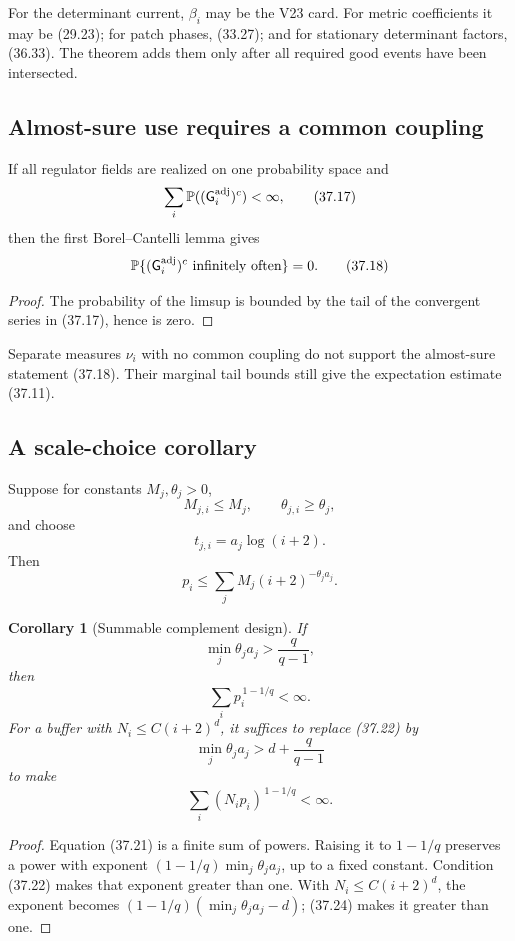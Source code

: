 \documentclass[11pt]{article}
\newtheorem{corollary}[theorem]{Corollary}
\begin{document}
For the determinant current, \(\beta_i\) may be the V23 card.  For
metric coefficients it may be (29.23); for patch phases, (33.27); and
for stationary determinant factors, (36.33).  The theorem adds them
only after all required good events have been intersected.

\subsection{Almost-sure use requires a common coupling}

If all regulator fields are realized on one probability space and
\[
 \sum_i\mathbb P((\mathsf G_i^{\rm adj})^c)<\infty,
 \tag{37.17}
\]
then the first Borel--Cantelli lemma gives
\[
 \mathbb P\{
 (\mathsf G_i^{\rm adj})^c\text{ infinitely often}
 \}=0.
 \tag{37.18}
\]

\begin{proof}
The probability of the limsup is bounded by the tail of the convergent
series in (37.17), hence is zero.
\end{proof}

Separate measures \(\nu_i\) with no common coupling do not support the
almost-sure statement (37.18).  Their marginal tail bounds still give
the expectation estimate (37.11).

\subsection{A scale-choice corollary}

Suppose for constants \(M_j,\theta_j>0\),
\[
 M_{j,i}\leq M_j,\qquad \theta_{j,i}\geq\theta_j,
 \tag{37.19}
\]
and choose
\[
 t_{j,i}=a_j\log(i+2).
 \tag{37.20}
\]
Then
\[
 p_i\leq
 \sum_jM_j(i+2)^{-\theta_ja_j}.
 \tag{37.21}
\]

\begin{corollary}[Summable complement design]
\label{cor:v11v37-scale-choice}
If
\[
 \min_j\theta_ja_j
 >
 \frac{q}{q-1},
 \tag{37.22}
\]
then
\[
 \sum_i p_i^{\,1-1/q}<\infty.
 \tag{37.23}
\]
For a buffer with \(N_i\leq C(i+2)^d\), it suffices to replace
(37.22) by
\[
 \min_j\theta_ja_j
 >
 d+\frac{q}{q-1}
 \tag{37.24}
\]
to make
\[
 \sum_i(N_ip_i)^{\,1-1/q}<\infty.
 \tag{37.25}
\]
\end{corollary}

\begin{proof}
Equation (37.21) is a finite sum of powers.  Raising it to
\(1-1/q\) preserves a power with exponent
\((1-1/q)\min_j\theta_ja_j\), up to a fixed constant.
Condition (37.22) makes that exponent greater than one.
With \(N_i\leq C(i+2)^d\), the exponent becomes
\((1-1/q)(\min_j\theta_ja_j-d)\); (37.24) makes it greater than one.
\end{proof}
\end{document}
